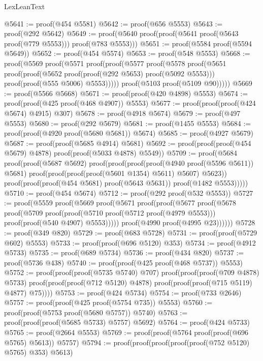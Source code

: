 \begin{lexlean}{LexLeanText}
\begin{coremodule}
@5641 := proof(@454 @5581)
@5642 := proof(@656 @5553)
@5643 := proof(@292 @5642)
@5649 := proof(@5640 proof(proof(@5641 proof(@5643 proof(@779 @5553))) proof(@783 @5553)))
@5651 := proof(@5584 proof(@5594 @5649))
@5652 := proof(@454 @5574)
@5653 := proof(@548 @5553)
@5668 := proof(@5569
      proof(@5571
          proof(proof(@5577
                proof(@5578
                    proof(@5651
                        proof(proof(@5652 proof(proof(@292 @5653) proof(@5092 @5553)))
                            proof(proof(@555 @5006) @5553)))))
              proof(@5103 proof(@5109 @90)))))
@5669 := proof(@5566 @5668)
@5671 := proof(proof(@420 @4898) @5553)
@5674 := proof(proof(@425 proof(@468 @4907)) @5553)
@5677 := proof(proof(proof(@424 @5674) @4915) @307)
@5678 := proof(@4918 @5674)
@5679 := proof(@497 @5553)
@5680 := proof(@292 @5679)
@5681 := proof(@1455 @5553)
@5684 := proof(proof(@4920 proof(@5680 @5681)) @5674)
@5685 := proof(@4927 @5679)
@5687 := proof(proof(@5685 @4914) @5681)
@5692 := proof(proof(proof(@454 @5679) @4878) proof(proof(@5033 @4878) @5549))
@5709 := proof(@5684
      proof(proof(@5687 @5692)
          proof(proof(proof(proof(@4940 proof(@5596 @5611)) @5681)
                proof(proof(proof(proof(@5601 @1354) @5611) @5607) @5623))
              proof(proof(proof(@454 @5681) proof(@5643 @5631)) proof(@1482 @5553)))))
@5710 := proof(@454 @5674)
@5712 := proof(@292 proof(@532 @5553))
@5727 := proof(@5559
      proof(@5669
          proof(@5671
              proof(proof(@5677
                    proof(@5678
                        proof(@5709
                            proof(proof(@5710 proof(@5712 proof(@4979 @5553)))
                                proof(proof(@540 @4907) @5553)))))
                  proof(@4990 proof(@4995 @23))))))
@5728 := proof(@349 @820)
@5729 := proof(@683 @5728)
@5731 := proof(proof(@5729 @602) @5553)
@5733 := proof(proof(@696 @5120) @353)
@5734 := proof(@4912 @5733)
@5735 := proof(@689 @5734)
@5736 := proof(@434 @820)
@5737 := proof(@5736 @438)
@5740 := proof(proof(@425 proof(@468 @5737)) @5553)
@5752 := proof(proof(proof(@5735 @5740) @707)
      proof(proof(proof(@709 @4878) @5733)
          proof(proof(proof(@712 @5120) @4878) proof(proof(proof(@715 @5119) @4877) @75))))
@5753 := proof(@424 @5734)
@5754 := proof(@733 @2646)
@5757 := proof(proof(@425 proof(@5754 @735)) @5553)
@5760 := proof(proof(@5753 proof(@5680 @5757)) @5740)
@5763 := proof(proof(proof(@5685 @5733) @5757) @5692)
@5764 := proof(@424 @5733)
@5765 := proof(@2664 @5553)
@5769 := proof(proof(@5764 proof(proof(@696 @5765) @5613)) @5757)
@5794 := proof(proof(proof(proof(proof(@752 @5120) @5765) @353) @5613)

\end{coremodule}
\end{lexlean}
